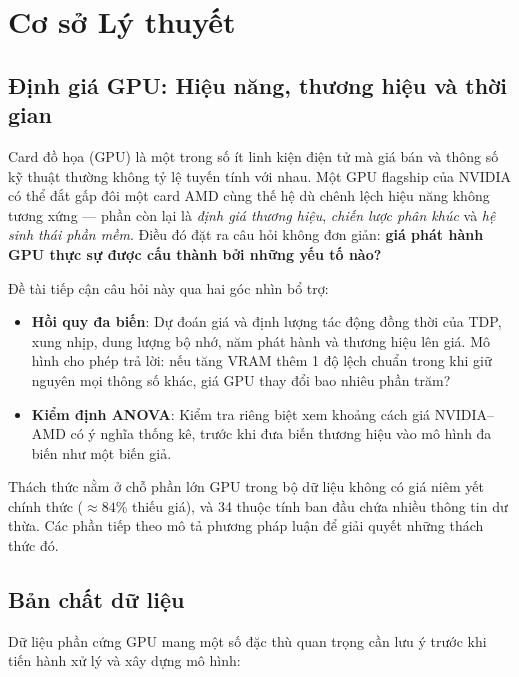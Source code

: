 \section{Cơ sở Lý thuyết}
\label{sec:co_so_ly_thuyet}

\subsection{Định giá GPU: Hiệu năng, thương hiệu và thời gian}

Card đồ họa (GPU) là một trong số ít linh kiện điện tử mà giá bán và thông số kỹ thuật thường không tỷ lệ tuyến tính với nhau. Một GPU flagship của NVIDIA có thể đắt gấp đôi một card AMD cùng thế hệ dù chênh lệch hiệu năng không tương xứng --- phần còn lại là \textit{định giá thương hiệu}, \textit{chiến lược phân khúc} và \textit{hệ sinh thái phần mềm}. Điều đó đặt ra câu hỏi không đơn giản: \textbf{giá phát hành GPU thực sự được cấu thành bởi những yếu tố nào?}

Đề tài tiếp cận câu hỏi này qua hai góc nhìn bổ trợ:

\begin{itemize}
  \item \textbf{Hồi quy đa biến}: Dự đoán giá và định lượng tác động đồng thời của TDP, xung nhịp, dung lượng bộ nhớ, năm phát hành và thương hiệu lên giá. Mô hình cho phép trả lời: nếu tăng VRAM thêm 1 độ lệch chuẩn trong khi giữ nguyên mọi thông số khác, giá GPU thay đổi bao nhiêu phần trăm?
  \item \textbf{Kiểm định ANOVA}: Kiểm tra riêng biệt xem khoảng cách giá NVIDIA--AMD có ý nghĩa thống kê, trước khi đưa biến thương hiệu vào mô hình đa biến như một biến giả.
\end{itemize}

Thách thức nằm ở chỗ phần lớn GPU trong bộ dữ liệu không có giá niêm yết chính thức ($\approx 84\%$ thiếu giá), và 34 thuộc tính ban đầu chứa nhiều thông tin dư thừa. Các phần tiếp theo mô tả phương pháp luận để giải quyết những thách thức đó.

\subsection{Bản chất dữ liệu} \label{sec:data_characteristics}

Dữ liệu phần cứng GPU mang một số đặc thù quan trọng cần lưu ý trước khi tiến hành xử lý và xây dựng mô hình:

